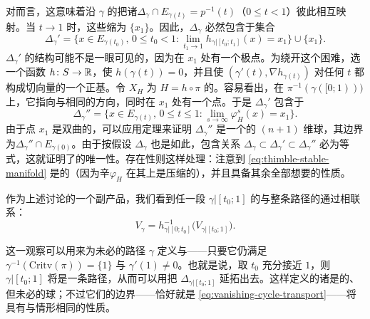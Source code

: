 \noqed
对\trLefschetzThimble{}而言，这意味着沿 $\gamma$ 的\trParallelTransport{}把诸\trLevelSet{}$\Delta_\gamma\cap E_{\gamma(t)}=p^{-1}(t)$（$0\le t<1$）彼此相互映射。当 $t\to 1$ 时，这些\trLevelSet{}缩为 $\{x_1\}$。因此，$\Delta_\gamma$ 必然包含于集合
\begin{equation*}
\Delta_\gamma'=\{x\in E_{\gamma(t_0)},\,0\le t_0<1:\lim_{t_1\to 1}h_{\gamma|[t_0;t_1]}(x)=x_1\}\cup\{x_1\}.
\end{equation*}
$\Delta_\gamma'$ 的结构可能不是一眼可见的，因为\trParallelTransport{}\trVectorField{}在 $x_1$ 处有一个极点。为绕开这个困难，选一个\trSmooth{}函数 $h\colon S\to\mathbb{R}$，使 $h(\gamma(t))=0$，并且使 $(\gamma'(t),\nabla h_{\gamma(t)})$ 对任何 $t$ 都构成切向量的一个正\trOrientation{}基。令 $X_H$ 为 $H=h\circ\pi$ 的\trHamiltonianVectorField{}。容易看出，在 $\pi^{-1}(\gamma([0;1)))$ 上，它指向与\trParallelTransport{}\trVectorField{}相同的方向，同时在 $x_1$ 处有一个\trStationary{}点。于是 $\Delta_\gamma'$ 包含于
\begin{equation}\label{eq:thimble-stable-manifold}
\Delta_\gamma''=\{x\in E_{\gamma(t)},\,0\le t\le 1:\lim_{s\to\infty}\varphi_H^s(x)=x_1\}.
\end{equation}
由于\trStationary{}点 $x_1$ 是双曲的，可以应用\trStableManifold{}定理来证明 $\Delta_\gamma''$ 是一个\trEmbedding{}的 $(n{+}1)$ 维球，其边界为\trSphere{}$\Delta_\gamma''\cap E_{\gamma(0)}$。由于按假设 $\Delta_\gamma$ 也是如此，包含关系 $\Delta_\gamma\subset\Delta_\gamma'\subset\Delta_\gamma''$ 必为等式，这就证明了\trLefschetzThimble{}的唯一性。存在性则这样处理：注意到 \eqref{eq:thimble-stable-manifold} 是\trLagrange{}的（因为辛\trFlow{}$\varphi_H$ 在其上是压缩的），并且具备其余全部想要的性质。
\begin{remark}\label{thm:vanishing-cycle-piece-transport}
作为上述讨论的一个副产品，我们看到任一段 $\gamma|[t_0;1]$ 的\trVanishingCycle{}与整条路径的\trVanishingCycle{}通过\trParallelTransport{}相联系：
\begin{equation}\label{eq:vanishing-cycle-transport}
V_\gamma=h_{\gamma|[0;t_0]}^{-1}\bigl(V_{\gamma|[t_0;1]}\bigr).
\end{equation}
\end{remark}
这一观察可以用来为未必\trEmbedding{}的路径 $\gamma$ 定义\trLefschetzThimble{}与\trVanishingCycle{}——只要它仍满足 $\gamma^{-1}(\mathrm{Critv}(\pi))=\{1\}$ 与 $\gamma'(1)\neq 0$。也就是说，取 $t_0$ 充分接近 $1$，则 $\gamma|[t_0;1]$ 将是一条\trEmbedding{}路径，从而可以用\trParallelTransport{}把 $\Delta_{\gamma|[t_0;1]}$ 延拓出去。这样定义的诸\trLefschetzThimble{}是\trImmersion{}的、但未必\trEmbedding{}的\trLagrange{}球；不过它们的边界——恰好就是 \eqref{eq:vanishing-cycle-transport}——将具有与\trEmbedding{}情形相同的性质。
